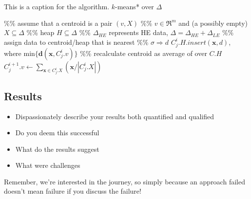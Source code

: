 \documentclass[fleqn,10pt]{SelfArx} %
\begin{document}
\begin{algorithm}
\caption{This is a caption for the algorithm.  $k$-means* over $\Delta$}
\label{alg:1}
\begin{algorithmic}[1]
\STATE \%\% assume that a centroid is a pair $(v,X)$
\STATE \%\% $v\in \Re^m$ and (a possibly empty) $ X\subseteq \Delta$
\STATE \%\% heap $ H \subseteq \Delta$
\STATE \%\% $\Delta_{HE}$ represents HE data, $\Delta = \Delta_{HE} +  \Delta_{LE}$
\REPEAT
{}
\STATE \%\% assign data to centroid/heap that is nearest
\STATE \%\% $\sigma \Rightarrow d$
\STATE $C_j^i.H.insert(\mathbf{x},d)$, where min$\{ \textbf{d}(\mathbf{x}, C_j^i.v)\}$
\ENDFOR
\ENDFOR
\STATE{\ $\Delta^\prime \leftarrow \emptyset$}
\STATE \%\% recalculate centroid as average of over $C.H$
\STATE $C_j^{i+1}.v \leftarrow  \sum\nolimits_{\mathbf{x} \in C_j^i.X} (\mathbf{x}/|C_j^i.X|) $
\ENDFOR
{}
\end{algorithmic}
\end{algorithm}




\subsection{Results}
\begin{itemize}[noitemsep]
\item Dispassionately describe your results both quantified and qualified
\item Do you deem this successful
\item What do the results suggest
\item What were challenges
\end{itemize}
Remember, we're interested in the journey, so simply because an approach failed doesn't mean failure if you discuss the failure!
\end{document}
